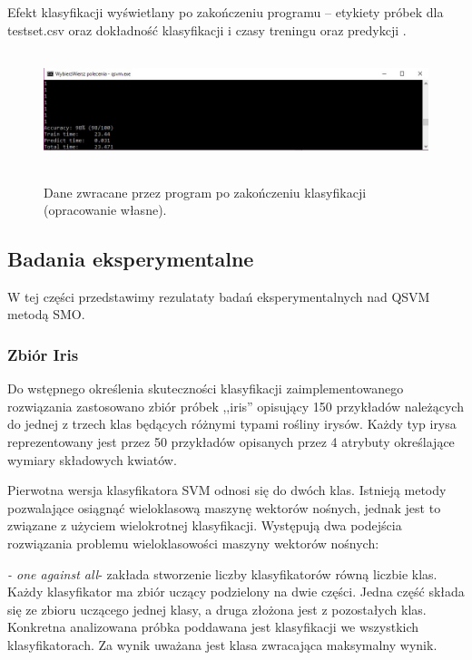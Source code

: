 \documentclass[[10pt,a4paper]{article}
\begin{document}
\begin{enumerate}
\noindent Efekt klasyfikacji wyświetlany po zakończeniu programu -- etykiety próbek dla testset.csv oraz dokładność klasyfikacji i czasy treningu oraz predykcji .
\begin{figure}[h]
\centering
\includegraphics[width=4.50in, height=1.32in]{results.jpg}\\
\caption{Dane zwracane przez program po zakończeniu klasyfikacji (opracowanie własne).}
\end{figure}

\subsection{Badania eksperymentalne} 

\noindent W tej części przedstawimy rezulataty badań eksperymentalnych nad QSVM metodą SMO.


\subsubsection{Zbiór Iris}


\noindent Do wstępnego określenia skuteczności klasyfikacji zaimplementowanego rozwiązania zastosowano zbiór próbek ,,iris'' opisujący 150 przykładów należących do jednej z trzech klas będących różnymi typami rośliny irysów. Każdy typ irysa reprezentowany jest przez 50 przykładów opisanych przez 4 atrybuty określające wymiary składowych kwiatów. 

\noindent Pierwotna wersja klasyfikatora SVM odnosi się do dwóch klas. Istnieją metody pozwalające osiągnąć wieloklasową maszynę wektorów nośnych, jednak jest to związane z użyciem wielokrotnej klasyfikacji. Występują dwa podejścia rozwiązania problemu wieloklasowości maszyny wektorów nośnych:

\noindent \textit{- one against all}- zakłada stworzenie liczby klasyfikatorów równą liczbie klas. Każdy klasyfikator ma zbiór uczący podzielony na dwie części. Jedna część składa się ze zbioru uczącego jednej klasy, a druga złożona jest z pozostałych klas. Konkretna analizowana próbka poddawana jest klasyfikacji we wszystkich klasyfikatorach. Za wynik uważana jest klasa zwracająca maksymalny wynik.


\end{enumerate}
\end{document}
